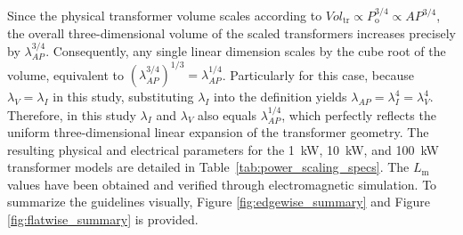 Since the physical transformer volume scales according to $Vol_{\mathrm{tr}} \propto P_{\mathrm{o}}^{3/4} \propto AP^{3/4}$, the overall three-dimensional volume of the scaled transformers increases precisely by $\lambda_{AP}^{3/4}$. Consequently, any single linear dimension scales by the cube root of the volume, equivalent to $(\lambda_{AP}^{3/4})^{1/3} = \lambda_{AP}^{1/4}$. Particularly for this case, because $\lambda_V = \lambda_I$ in this study, substituting $\lambda_I$ into the definition yields $\lambda_{AP} = \lambda_I^4 = \lambda_V^4$. Therefore, in this study $\lambda_I$ and $\lambda_V$ also equals $\lambda_{AP}^{1/4}$, which perfectly reflects the uniform three-dimensional linear expansion of the transformer geometry. The resulting physical and electrical parameters for the 1~kW, 10~kW, and 100~kW transformer models are detailed in Table~\ref{tab:power_scaling_specs}. The $L_\mathrm{m}$ values have been obtained and verified through electromagnetic simulation. To summarize the guidelines visually, Figure \ref{fig:edgewise_summary} and Figure \ref{fig:flatwise_summary} is provided. 

